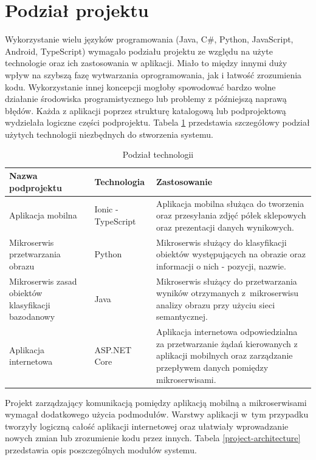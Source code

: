 \section{Podział projektu}
{Wykorzystanie wielu języków programowania (Java, C\#, Python, JavaScript, Android, TypeScript) wymagało podziału projektu ze względu na użyte technologie oraz ich zastosowania w aplikacji. Miało to między innymi duży wpływ na szybszą fazę wytwarzania oprogramowania, jak i łatwość zrozumienia kodu. Wykorzystanie innej koncepcji mogłoby spowodować bardzo wolne działanie środowiska programistycznego lub problemy z późniejszą naprawą błędów. Każda z aplikacji poprzez strukturę katalogową lub podprojektową wydzielała logiczne części podprojektu. Tabela \ref{architecture} przedstawia szczegółowy podział użytych technologii niezbędnych do stworzenia systemu.
	
		\begin{table}[htbp]
		\caption{Podział technologii}
		\label{architecture}
		\begin{center}
			\begin{tabular}{ | p{4cm}| p{3cm} | p{6cm} |}
				\hline Nazwa podprojektu & Technologia &  Zastosowanie \\ \hline   
				\hline  Aplikacja mobilna &  Ionic - TypeScript & Aplikacja mobilna służąca do tworzenia oraz przesyłania zdjęć półek sklepowych oraz prezentacji danych wynikowych.\\ \hline
				
				\hline  Mikroserwis przetwarzania obrazu & Python & Mikroserwis służący do klasyfikacji obiektów występujących na obrazie oraz informacji o nich - pozycji, nazwie.\\ \hline
				
				\hline Mikroserwis zasad obiektów klasyfikacji \mbox{bazodanowy} & Java & Mikroserwis służący do przetwarzania wyników otrzymanych z~mikroserwisu analizy obrazu przy użyciu sieci semantycznej.\\ \hline
				
				\hline Aplikacja internetowa & ASP.NET Core & Aplikacja internetowa odpowiedzialna za przetwarzanie żądań kierowanych z aplikacji mobilnych oraz zarządzanie przepływem danych pomiędzy mikroserwisami.\\ \hline
			\end{tabular}
		\end{center}
	\end{table}	
	
	
Projekt zarządzający komunikacją pomiędzy aplikacją mobilną a mikroserwisami wymagał dodatkowego użycia podmodułów. Warstwy aplikacji w~tym przypadku tworzyły logiczną całość aplikacji internetowej oraz ułatwiały wprowadzanie nowych zmian lub zrozumienie kodu przez innych. Tabela \ref{project-architecture} przedstawia opis poszczególnych modułów systemu.


}
